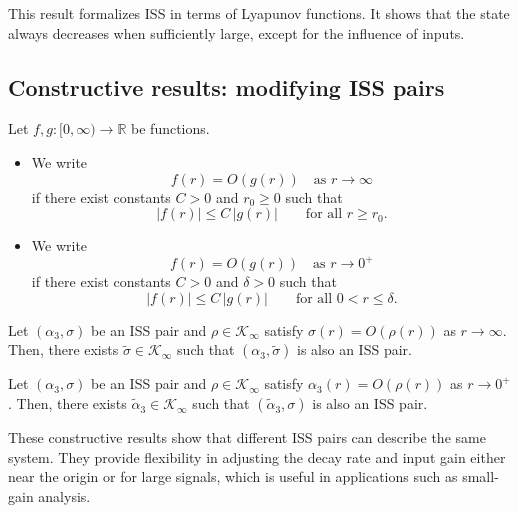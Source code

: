 \begin{remark}
This result formalizes ISS in terms of Lyapunov functions. 
It shows that the state always decreases when sufficiently large, 
except for the influence of inputs.
\end{remark}

\subsection{Constructive results: modifying ISS pairs}

\begin{definition}
Let $f,g:[0,\infty)\to\mathbb{R}$ be functions.  

\begin{itemize}
    \item We write 
    \[
    f(r) = O(g(r)) \quad \text{as } r \to \infty
    \]
    if there exist constants $C>0$ and $r_0 \ge 0$ such that
    \[
    |f(r)| \le C\,|g(r)| \qquad \text{for all } r \ge r_0.
    \]
    \item We write 
    \[
    f(r) = O(g(r)) \quad \text{as } r \to 0^+
    \]
    if there exist constants $C>0$ and $\delta > 0$ such that
    \[
    |f(r)| \le C\,|g(r)| \qquad \text{for all } 0<r \le \delta.
    \]
\end{itemize}
\end{definition}

\begin{theorem}
Let $(\alpha_3,\sigma)$ be an ISS pair and $\rho\in\mathcal{K}_\infty$ satisfy 
$\sigma(r) = O(\rho(r))$ as $r\to\infty$. Then, there exists 
$\tilde\sigma\in\mathcal{K}_\infty$ such that $(\alpha_3,\tilde\sigma)$ is also an ISS pair.
\end{theorem}

\begin{theorem}
Let $(\alpha_3,\sigma)$ be an ISS pair and $\rho\in\mathcal{K}_\infty$ satisfy 
$\alpha_3(r) = O(\rho(r))$ as $r\to 0^+$. Then, there exists 
$\tilde\alpha_3\in\mathcal{K}_\infty$ such that $(\tilde\alpha_3,\sigma)$ 
is also an ISS pair.
\end{theorem}

\begin{remark}
These constructive results show that different ISS pairs can describe the same system. 
They provide flexibility in adjusting the decay rate and input gain either near the origin 
or for large signals, which is useful in applications such as small-gain analysis.
\end{remark}

